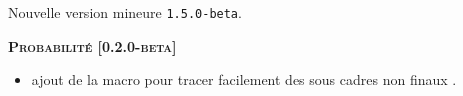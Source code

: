 Nouvelle version mineure \verb+1.5.0-beta+.




\begin{center}
    \textbf{\textsc{Probabilité [0.2.0-beta]}}
\end{center}

\begin{itemize}[itemsep=.5em]
    \item {}
          ajout de la macro  pour tracer facilement des sous cadres non \og finaux \fg.

    
\end{itemize}


\separation
